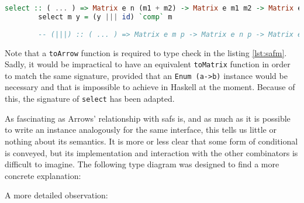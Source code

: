 \documentclass[
  oneside,
  11pt, a4paper,
  footinclude=true,
  headinclude=true,
  cleardoublepage=empty
]{scrbook}
\theoremstyle{definition}
\theoremstyle{definition}
\begin{document}
        \begin{lstlisting}[language=Haskell, label={lst:safm2}, caption={LAoP Selective instance},captionpos=b]
        select :: ( ... ) => Matrix e n (m1 + m2) -> Matrix e m1 m2 -> Matrix e n m2
        select m y = (y ||| id) `comp` m
            
        -- (|||) :: ( ... ) => Matrix e m p -> Matrix e n p -> Matrix e (m + n) p
        \end{lstlisting}{}
        
        Note that a \texttt{toArrow} function is required to type check in the listing \ref{lst:safm}. Sadly, it would be impractical to have an equivalent \texttt{toMatrix} function in order to match the same signature, provided that an \texttt{Enum (a->b)} instance would be necessary and that is impossible to achieve in Haskell at the moment. Because of this, the signature of \texttt{select} has been adapted.
        
        As fascinating as Arrows' relationship with \glspl{saf} is, and as much as it is possible to write an instance analogously for the same interface, this tells us little or nothing about its semantics. It is more or less clear that some form of conditional is conveyed, but its implementation and interaction with the other combinators is difficult to imagine. The following type diagram was designed to find a more concrete explanation:
        
        \vskip0.2cm
        
        \begin{center}
        \end{center}
        
        A more detailed observation:
        
\end{document}
